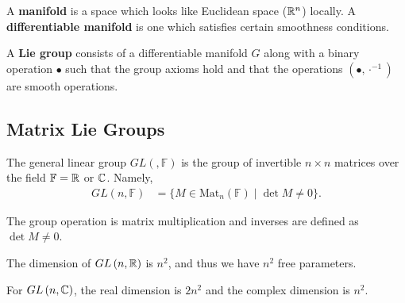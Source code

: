 
\begin{definition}
    A \textbf{manifold} is a space which looks like Euclidean space ($\mathbb{R}^{n}$) locally.
    A \textbf{differentiable manifold} is one which satisfies certain smoothness conditions.
\end{definition}

\begin{definition} \label{eq:Lie_Group}
    A \textbf{Lie group} consists of a differentiable manifold $G$ along with a binary operation $\bullet$ such that the group axioms hold and that the operations $\left( \bullet, \cdot^{-1} \right) $ are smooth operations.
\end{definition}

\subsection{Matrix Lie Groups}

The general linear group $GL \left( , \mathbb{F} \right) $ is the group of invertible $n \times  n$ matrices over the field $\mathbb{F} = \mathbb{R}$ or $\mathbb{C}$. Namely,
\begin{align}
    GL \left( n, \mathbb{F} \right) &= \{M \in \text{Mat}_n \left( \mathbb{F} \right)  \mid  \det M \neq 0 \}
.\end{align}

The group operation is matrix multiplication and inverses are defined as $\det M \neq 0$.

The dimension of $GL \left( n, \mathbb{R} \right) $ is $n^2$, and thus we have $n^2$ free parameters.

For $GL \left( n, \mathbb{C} \right) $, the real dimension is $2n^2$ and the complex dimension is $n^2$.


